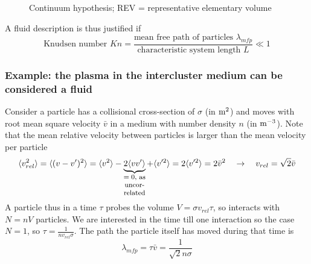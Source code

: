 \begin{figure}[!htb]
 \centering
 \hfill
 \caption{Continuum hypothesis; REV = representative elementary volume}
 \label{fig:continuum_hypothesis}
\end{figure}

\begin{mdframed}[style = padded]
    A fluid description is thus justified if
    \begin{equation}
        \text{Knudsen number } Kn = \frac{\text{mean free path of particles } \lambda_{mfp}}{\text{characteristic system length } L} \ll 1
    \end{equation}
\end{mdframed}

\subsubsection{Example: the plasma in the intercluster medium can be considered a fluid\skipthis}
\label{ssssec:mean_free_path}
Consider a particle has a collisional cross-section of $\sigma$ (in $\operatorname{m}^2$) and moves with root mean square velocity
$\bar{v}$ in a medium with number density $n$ (in $\operatorname{m}^{-3}$). Note that the mean relative velocity
between particles is larger than the mean velocity per particle
\begin{equation}
    \langle v_{rel}^2 \rangle = \langle (v-v')^2 \rangle = \langle v^2 \rangle - \explain{2 \langle vv' \rangle}{$=0$, as uncorrelated} + \langle v'^2 \rangle = 2 \langle v'^2 \rangle = 2 \bar{v}^2 \quad \rightarrow \quad v_{rel} = \sqrt{2} \bar{v}
\end{equation}
A particle thus in a time $\tau$ probes the volume $V = \sigma v_{rel} \tau$, so interacts with $N = nV$ particles. We
are interested in the time till one interaction so the case $N = 1$, so $\tau = \frac{1}{n v_{rel} \sigma}$. The path
the particle itself has moved during that time is
\begin{equation}
    \lambda_{mfp} = \tau \bar{v} = \frac{1}{\sqrt{2} n \sigma}
\end{equation}
